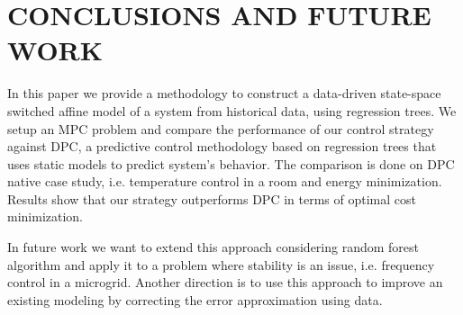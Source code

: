 \documentclass[letterpaper, 10 pt, conference]{ifacconf}  %
\begin{document}

\section{CONCLUSIONS AND FUTURE WORK}\label{secConclusion}
In this paper we provide a methodology to construct a data-driven state-space switched affine model of a system from historical data, using regression trees. We setup an MPC problem and compare the performance of our control strategy against DPC, a predictive control methodology based on regression trees that uses static models to predict system's behavior. The comparison is done on DPC native case study, i.e. temperature control in a room and energy minimization. Results show that our strategy outperforms DPC in terms of optimal cost minimization.

In future work we want to extend this approach considering random forest algorithm and apply it to a problem where stability is an issue, i.e. frequency control in a microgrid. Another direction is to use this approach to improve an existing modeling by correcting the error approximation using data.



\end{document}
